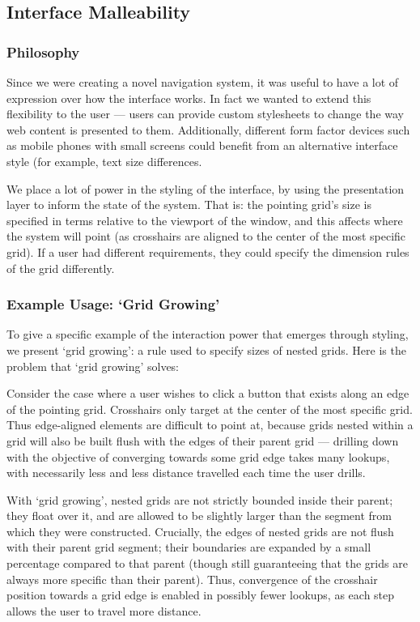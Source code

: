 \documentclass[a4paper, 12pt]{report}
\begin{document}
\subsection{Interface Malleability}
\subsubsection{Philosophy}
Since we were creating a novel navigation system, it was useful to have a lot of expression over how the interface works. In fact we wanted to extend this flexibility to the user --- users can provide custom stylesheets\cite{stylebot} to change the way web content is presented to them. Additionally, different form factor devices such as mobile phones with small screens could benefit from an alternative interface style (for example, text size differences.

We place a lot of power in the styling of the interface, by using the presentation layer to inform the state of the system. That is: the pointing grid's size is specified in terms relative to the viewport of the window, and this affects where the system will point (as crosshairs are aligned to the center of the most specific grid). If a user had different requirements, they could specify the dimension rules of the grid differently.

\subsubsection{Example Usage: `Grid Growing'}
To give a specific example of the interaction power that emerges through styling, we present `grid growing': a rule used to specify sizes of nested grids. Here is the problem that `grid growing' solves:

Consider the case where a user wishes to click a button that exists along an edge of the pointing grid. Crosshairs only target at the center of the most specific grid. Thus edge-aligned elements are difficult to point at, because grids nested within a grid will also be built flush with the edges of their parent grid --- drilling down with the objective of converging towards some grid edge takes many lookups, with necessarily less and less distance travelled each time the user drills.

With `grid growing', nested grids are not strictly bounded inside their parent; they float over it, and are allowed to be slightly larger than the segment from which they were constructed. Crucially, the edges of nested grids are not flush with their parent grid segment; their boundaries are expanded by a small percentage compared to that parent (though still guaranteeing that the grids are always more specific than their parent). Thus, convergence of the crosshair position towards a grid edge is enabled in possibly fewer lookups, as each step allows the user to travel more distance.
\end{document}
